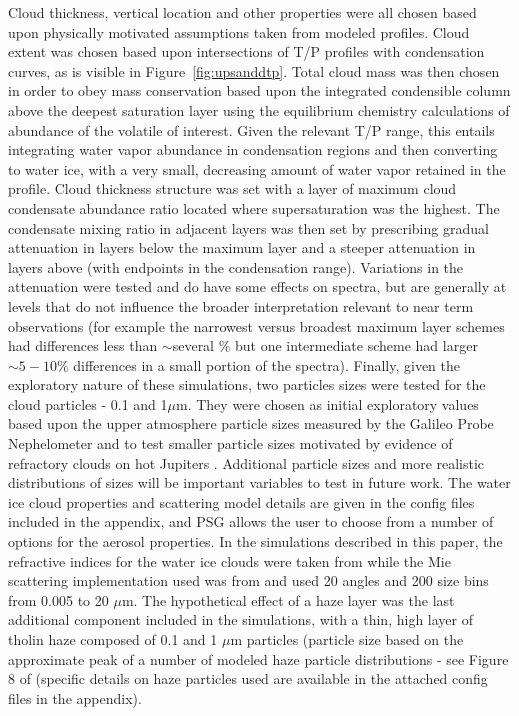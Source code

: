 \documentclass[12pt, letterpaper]{aastex631}
\begin{document}
Cloud thickness, vertical location and other properties were all chosen based upon physically motivated assumptions taken from modeled profiles.  Cloud extent was chosen based upon intersections of T/P profiles with condensation curves, as is visible in Figure~\ref{fig:upsanddtp}.  Total cloud mass was then chosen in order to obey mass conservation based upon the integrated condensible column above the deepest saturation layer using the equilibrium chemistry calculations of abundance of the volatile of interest. Given the relevant T/P range, this entails integrating water vapor abundance in condensation regions and then converting to water ice, with a very small, decreasing amount of water vapor retained in the profile.  Cloud thickness structure was set with a layer of maximum cloud condensate abundance ratio located where supersaturation was the highest.  The condensate mixing ratio in adjacent layers was then set by prescribing gradual attenuation in layers below the maximum layer and a steeper attenuation in layers above (with endpoints in the condensation range).  Variations in the attenuation were tested and do have some effects on spectra, but are generally at levels that do not influence the broader interpretation relevant to near term observations (for example the narrowest versus broadest maximum layer schemes had differences less than $\sim$several $\%$ but one intermediate scheme had larger $\sim5-10\%$ differences in a small portion of the spectra).  Finally, given the exploratory nature of these simulations, two particles sizes were tested for the cloud particles - 0.1 and 1\;$\mu$m. They were chosen as initial exploratory values based upon the upper atmosphere particle sizes measured by the Galileo Probe Nephelometer and to test smaller particle sizes motivated by evidence of refractory clouds on hot Jupiters \citep{2004jpsm.book...79W, 2016A&A...594A..48L}. Additional particle sizes and more realistic distributions of sizes will be important variables to test in future work. The water ice cloud properties and scattering model details are given in the config files included in the appendix, and PSG allows the user to choose from a number of options for the aerosol properties.  In the simulations described in this paper, the refractive indices for the water ice clouds were taken from \textcite{2013JQSRT.130..373M, 2017JQSRT.203....3G} while the Mie scattering implementation used was from \textcite{1983asls.book.....B} and used 20 angles and 200 size bins from 0.005 to 20 $\mu$m. The hypothetical effect of a haze layer was the last additional component included in the simulations, with a thin, high layer of tholin haze composed of 0.1 and 1 $\mu$m particles (particle size based on the approximate peak of a number of modeled haze particle distributions - see Figure 8 of \textcite{2021arXiv210203480G} (specific details on haze particles used are available in the attached config files in the appendix).
\end{document}
